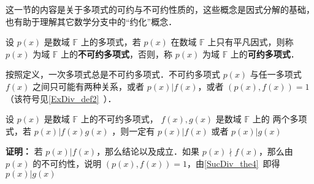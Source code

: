 
\begin{issues}
\issueTODO
\end{issues}


这一节的内容是关于多项式的可约与不可约性质的，这些概念是因式分解的基础，也有助于理解其它数学分支中的“约化”概念．
\begin{definition}{}
设 $p(x)$ 是数域 $\mathbb{F}$ 上的多项式，若 $p(x)$ 在数域 $\mathbb{F}$ 上只有平凡因式，则称 $p(x)$ 为域 $\mathbb{F}$ 上的\textbf{不可约多项式}，否则，称 $p(x)$ 为域 $\mathbb{F}$ 上的\textbf{可约多项式}．
\end{definition}
按照定义，一次多项式总是不可约多项式．不可约多项式 $p(x)$ 与任一多项式 $f(x)$ 之间只可能有两种关系，或者 $p(x)|f(x)$，或者 $(p(x),f(x))=1$（该符号见\autoref{ExDiv_def2}~）．

\begin{theorem}{}
设 $p(x)$ 是数域 $\mathbb{F}$ 上的不可约多项式， $f(x),g(x)$ 是数域 $\mathbb{F}$ 上的 两个多项式，若 $p(x)|f(x)g(x)$ ，则一定有 $p(x)|f(x)$ 或者 $p(x)|g(x)$
\end{theorem}
\textbf{证明：} 若 $p(x)|f(x)$，那么结论以及成立．如果 $p(x)\nmid f(x)$，那么由 $p(x)$ 的不可约性，说明 $(p(x),f(x))=1$，由\autoref{SucDiv_the4}~即得 $p(x)|g(x)$